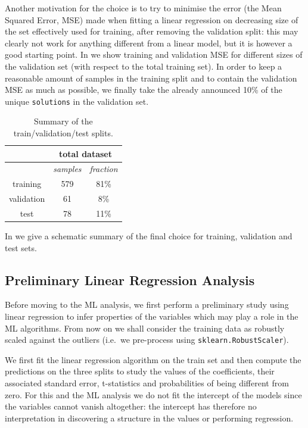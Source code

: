 Another motivation for the choice is to try to minimise the error (the Mean
Squared Error, MSE) made when fitting a linear regression on decreasing size of
the set effectively used for training, after removing the validation split:
this may clearly not work for anything different from a linear model, but it is
however a good starting point.
In  we show training and validation MSE for
different sizes of the validation set (with respect to the total training set).
In order to keep a reasonable amount of samples in the training split and to
contain the validation MSE as much as possible, we finally take the already
announced 10\% of the unique \texttt{solutions} in the validation set.
\begin{table}[htbp]
\centering
\begin{tabular}{@{}ccc@{}}
\toprule
           & \multicolumn{2}{c}{\textbf{total dataset}} \\
\midrule
           & \textit{samples}    & \textit{fraction}    \\
\midrule
training   & 579                 & 81\%                 \\
validation & 61                  & 8\%                  \\
test       & 78                  & 11\%                 \\
\bottomrule
\end{tabular}
\caption{Summary of the train/validation/test splits.}
\label{tab:reg:splits}
\end{table}
In  we give a schematic summary of the final choice for
training, validation and test sets.

\subsection{Preliminary Linear Regression Analysis}\label{sec:reg:prel}

Before moving to the ML analysis, we first perform a preliminary study using
linear regression to infer properties of the variables which may play a role in
the ML algorithms.
From now on we shall consider the training data as robustly scaled against the
outliers (i.e.\ we pre-process using \texttt{sklearn.RobustScaler}). 

We first fit the linear regression algorithm on the train set and then compute
the predictions on the three splits to study the values of the coefficients,
their associated standard error, t-statistics and probabilities of being
different from zero.
For this and the ML analysis we do not fit the intercept of the models since
the variables cannot vanish altogether: the intercept has therefore no
interpretation in discovering a structure in the values or performing
regression.

